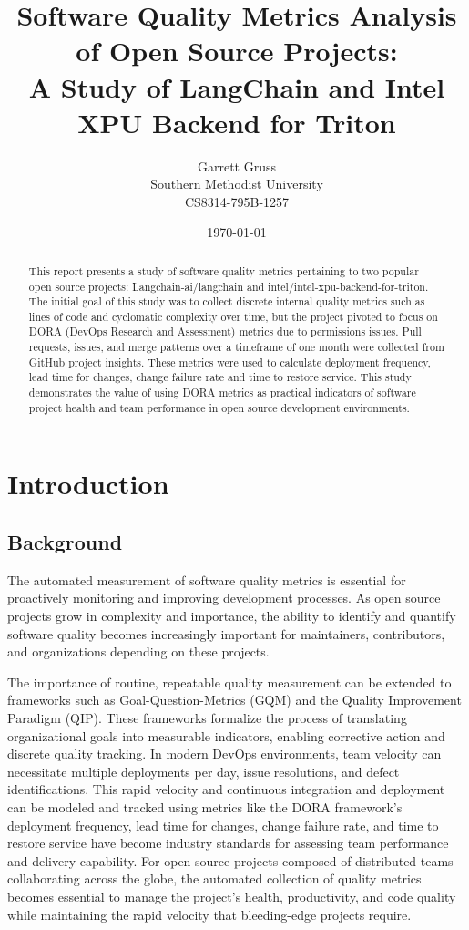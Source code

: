 \documentclass[12pt]{article}
\title{Software Quality Metrics Analysis of Open Source Projects: \\
A Study of LangChain and Intel XPU Backend for Triton}
\author{Garrett Gruss \\ Southern Methodist University \\ CS8314-795B-1257}
\date{\today}
\begin{document}
\maketitle

\begin{abstract}
  This report presents a study of software quality metrics pertaining to two
  popular open source projects: Langchain-ai/langchain and
  intel/intel-xpu-backend-for-triton.
  The initial goal of this study was to collect discrete internal
  quality metrics
  such as lines of code and cyclomatic complexity over time, but the
  project pivoted
  to focus on DORA (DevOps Research and Assessment) metrics due to permissions
  issues. Pull requests, issues, and merge patterns over a timeframe of one
  month were collected from GitHub project insights. These metrics were used
  to calculate deployment frequency, lead time for changes, change failure rate
  and time to restore service. This study demonstrates the value of
  using DORA metrics
  as practical indicators of software project health and team
  performance in open source development environments.
\end{abstract}

\newpage

\section{Introduction}

\subsection{Background}

The automated measurement of software quality metrics is essential
for proactively monitoring and improving development processes. As open
source projects grow in complexity and importance, the ability to identify and
quantify software quality becomes increasingly important for maintainers,
contributors, and organizations depending on these projects.

The importance of routine, repeatable quality measurement can be extended
to frameworks such as Goal-Question-Metrics (GQM) and the
Quality Improvement Paradigm (QIP). These frameworks formalize
the process of translating organizational goals into measurable
indicators, enabling corrective action and discrete quality tracking.
In modern DevOps environments, team velocity can necessitate
multiple deployments per day, issue resolutions, and defect
identifications. This rapid velocity
and continuous integration and deployment can be modeled and tracked
using metrics like the DORA framework's deployment
frequency, lead time for changes, change failure rate, and time to restore
service have become industry standards for assessing team performance and
delivery capability. For open source projects composed of
distributed teams collaborating across
the globe, the automated collection of quality metrics becomes essential
to manage the project's health, productivity, and code quality while maintaining
the rapid velocity that bleeding-edge projects require.
\end{document}
